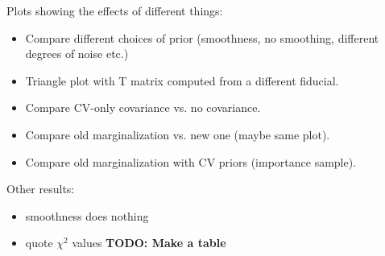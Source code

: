 \documentclass[a4paper,11pt]{article}
\newcommand{\todo}[1]{{\bf TODO: #1}}
\begin{document}

Plots showing the effects of different things:
\begin{itemize}
\item Compare different choices of prior (smoothness, no smoothing, different degrees of noise etc.)
\item Triangle plot with T matrix computed from a different fiducial.
\item Compare CV-only covariance vs. no covariance.
\item Compare old marginalization vs. new one (maybe same plot).
\item Compare old marginalization with CV priors (importance sample).
\end{itemize}

Other results:
\begin{itemize}
  \item smoothness does nothing
  \item quote $\chi^2$ values \todo{Make a table}
\end{itemize}
\end{document}
